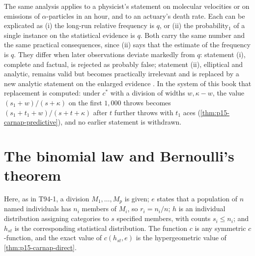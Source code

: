 The same analysis applies to a physicist's statement on molecular
velocities or on emissions of \(\alpha\)-particles in an hour, and to an
actuary's death rate. Each can be explicated as (i) the long-run
relative frequency is \(q\), or (ii) the probability\(_1\) of a single
instance on the statistical evidence is \(q\). Both carry the same
number and the same practical consequences, since (ii) says that the
estimate of the frequency is \(q\). They differ when later
observations deviate markedly from \(q\): statement (i), complete and
factual, is rejected as probably false; statement (ii), elliptical and
analytic, remains valid but becomes practically irrelevant and is
replaced by a new analytic statement on the enlarged evidence
\cite[sec.~42B, pp.~191--192]{Carnap1950Probability}. In the system of
this book that replacement is computed: under \(c^*\) with a division
of widths \(w,\kappa-w\), the value \((s_1+w)/(s+\kappa)\) on the first
\(1{,}000\) throws becomes \((s_1+t_1+w)/(s+t+\kappa)\) after \(t\)
further throws with \(t_1\) aces (\cref{thm:p15-carnap-predictive}),
and no earlier statement is withdrawn.

\section{The binomial law and Bernoulli's theorem}
\label{sec:p15-w02b-p15-029-bernoulli}

Here, as in T94-1, a division \(M_1,\ldots,M_p\) is given; \(e\)
states that a population of \(n\) named individuals has \(n_i\)
members of \(M_i\), so \(r_i=n_i/n\); \(h\) is an individual
distribution assigning categories to \(s\) specified members, with
counts \(s_i\leq n_i\); and \(h_{st}\) is the corresponding statistical
distribution. The function \(c\) is any symmetric \(c\)-function, and
the exact value of \(c(h_{st},e)\) is the hypergeometric value of
\cref{thm:p15-carnap-direct}.

